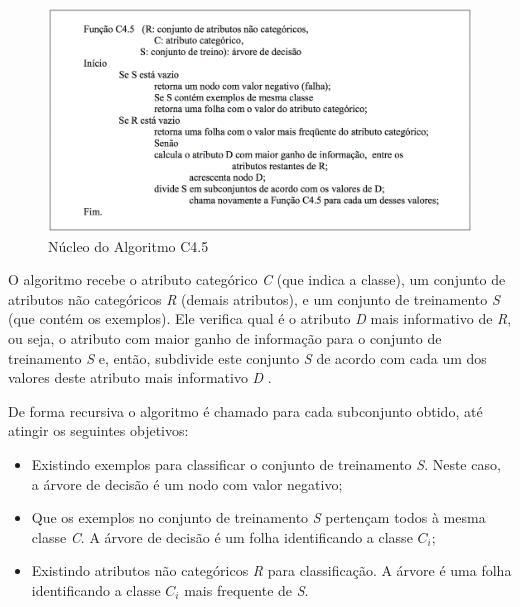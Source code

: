 \documentclass[
	12pt,				%
	openright,			%
	oneside,	
	a4paper,				%
	english,				%
	brazil				%
]{abntex2/abntex2} %
\begin{document}
		\begin{figure}[!htb]
			\caption{\label{fignucleoC45} \fontsize{10}{\baselineskip} \selectfont Núcleo do Algoritmo C4.5}
			\begin{center}
				\includegraphics[scale=0.4]{img/nucleoC45.png}
			\end{center}
		\end{figure}
	
	O algoritmo recebe o atributo categórico \textit{C} (que indica a classe), um conjunto de atributos não categóricos \textit{R} (demais atributos), e um conjunto de treinamento \textit{S} (que contém os exemplos). Ele verifica qual é o atributo \textit{D} mais informativo de \textit{R}, ou seja, o atributo com maior ganho de informação para o conjunto de treinamento \textit{S} e, então, subdivide este conjunto \textit{S} de acordo com cada um dos valores deste atributo mais informativo \textit{D} \cite{feldens:1997}.
	
	De forma recursiva o algoritmo é chamado para cada subconjunto obtido, até atingir os seguintes objetivos:
	
	\begin{itemize}
		\item Existindo exemplos para classificar o conjunto de treinamento \textit{S}. Neste caso, a árvore de decisão é um nodo com valor negativo;
		\item Que os exemplos no conjunto de treinamento \textit{S} pertençam todos à mesma classe \textit{C}. A árvore de decisão é um folha identificando a classe \textit{$C_i$};
		\item Existindo atributos não categóricos \textit{R} para classificação. A árvore é uma folha identificando a classe \textit{$C_i$} mais frequente de \textit{S}.
	\end{itemize}
	
\end{document}
